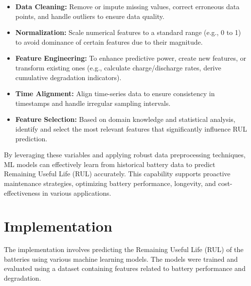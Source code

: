 \begin{itemize}
    \item \textbf{Data Cleaning:} Remove or impute missing values, correct erroneous data points, and handle outliers to ensure data quality.
    \item \textbf{Normalization:} Scale numerical features to a standard range (e.g., 0 to 1) to avoid dominance of certain features due to their magnitude.
    \item \textbf{Feature Engineering:} To enhance predictive power, create new features, or transform existing ones (e.g., calculate charge/discharge rates, derive cumulative degradation indicators).
    \item \textbf{Time Alignment:} Align time-series data to ensure consistency in timestamps and handle irregular sampling intervals.
    \item \textbf{Feature Selection:} Based on domain knowledge and statistical analysis, identify and select the most relevant features that significantly influence RUL prediction.
\end{itemize}

By leveraging these variables and applying robust data preprocessing techniques, ML models can effectively learn from historical battery data to predict Remaining Useful Life (RUL) accurately. This capability supports proactive maintenance strategies, optimizing battery performance, longevity, and cost-effectiveness in various applications.


\chapter{Implementation}
The implementation involves predicting the Remaining Useful Life (RUL) of the batteries using various machine learning models. The models were trained and evaluated using a dataset containing features related to battery performance and degradation.

